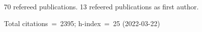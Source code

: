 70 refereed publications. 13 refeered publications as first author.

Total citations~=~2395; h-index~=~25 (2022-03-22)